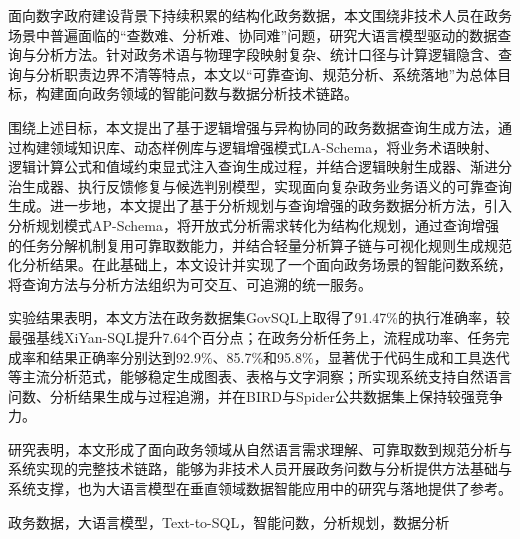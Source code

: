 
\cabstract
{
面向数字政府建设背景下持续积累的结构化政务数据，本文围绕非技术人员在政务场景中普遍面临的“查数难、分析难、协同难”问题，研究大语言模型驱动的数据查询与分析方法。针对政务术语与物理字段映射复杂、统计口径与计算逻辑隐含、查询与分析职责边界不清等特点，本文以“可靠查询、规范分析、系统落地”为总体目标，构建面向政务领域的智能问数与数据分析技术链路。

围绕上述目标，本文提出了基于逻辑增强与异构协同的政务数据查询生成方法，通过构建领域知识库、动态样例库与逻辑增强模式LA-Schema，将业务术语映射、逻辑计算公式和值域约束显式注入查询生成过程，并结合逻辑映射生成器、渐进分治生成器、执行反馈修复与候选判别模型，实现面向复杂政务业务语义的可靠查询生成。进一步地，本文提出了基于分析规划与查询增强的政务数据分析方法，引入分析规划模式AP-Schema，将开放式分析需求转化为结构化规划，通过查询增强的任务分解机制复用可靠取数能力，并结合轻量分析算子链与可视化规则生成规范化分析结果。在此基础上，本文设计并实现了一个面向政务场景的智能问数系统，将查询方法与分析方法组织为可交互、可追溯的统一服务。

实验结果表明，本文方法在政务数据集GovSQL上取得了91.47\%的执行准确率，较最强基线XiYan-SQL提升7.64个百分点；在政务分析任务上，流程成功率、任务完成率和结果正确率分别达到92.9\%、85.7\%和95.8\%，显著优于代码生成和工具迭代等主流分析范式，能够稳定生成图表、表格与文字洞察；所实现系统支持自然语言问数、分析结果生成与过程追溯，并在BIRD与Spider公共数据集上保持较强竞争力。

研究表明，本文形成了面向政务领域从自然语言需求理解、可靠取数到规范分析与系统实现的完整技术链路，能够为非技术人员开展政务问数与分析提供方法基础与系统支撑，也为大语言模型在垂直领域数据智能应用中的研究与落地提供了参考。
}
{政务数据，大语言模型，Text-to-SQL，智能问数，分析规划，数据分析}
